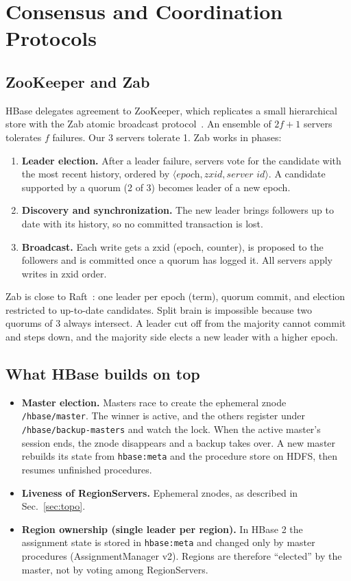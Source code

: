\documentclass[10pt,twocolumn,letterpaper]{article}
\newcommand{\code}[1]{\texttt{\small #1}}
\begin{document}
\section{Consensus and Coordination Protocols}\label{sec:consensus}

\subsection{ZooKeeper and Zab}
HBase delegates agreement to ZooKeeper, which replicates a small hierarchical store with the Zab atomic broadcast protocol~\cite{zookeeper,zab}. An ensemble of $2f{+}1$ servers tolerates $f$ failures. Our 3 servers tolerate 1. Zab works in phases:
\begin{enumerate}
\item \textbf{Leader election.} After a leader failure, servers vote for the candidate with the most recent history, ordered by $\langle\textit{epoch}, \textit{zxid}, \textit{server id}\rangle$. A candidate supported by a quorum (2 of 3) becomes leader of a new epoch.
\item \textbf{Discovery and synchronization.} The new leader brings followers up to date with its history, so no committed transaction is lost.
\item \textbf{Broadcast.} Each write gets a zxid (epoch, counter), is proposed to the followers and is committed once a quorum has logged it. All servers apply writes in zxid order.
\end{enumerate}
Zab is close to Raft~\cite{raft}: one leader per epoch (term), quorum commit, and election restricted to up-to-date candidates. Split brain is impossible because two quorums of 3 always intersect. A leader cut off from the majority cannot commit and steps down, and the majority side elects a new leader with a higher epoch.

\subsection{What HBase builds on top}
\begin{itemize}
\item \textbf{Master election.} Masters race to create the ephemeral znode \code{/hbase/master}. The winner is active, and the others register under \code{/hbase/backup-masters} and watch the lock. When the active master's session ends, the znode disappears and a backup takes over. A new master rebuilds its state from \code{hbase:meta} and the procedure store on HDFS, then resumes unfinished procedures.
\item \textbf{Liveness of RegionServers.} Ephemeral znodes, as described in Sec.~\ref{sec:topo}.
\item \textbf{Region ownership (single leader per region).} In HBase 2 the assignment state is stored in \code{hbase:meta} and changed only by master procedures (AssignmentManager v2). Regions are therefore ``elected'' by the master, not by voting among RegionServers.
\end{itemize}
\end{document}
